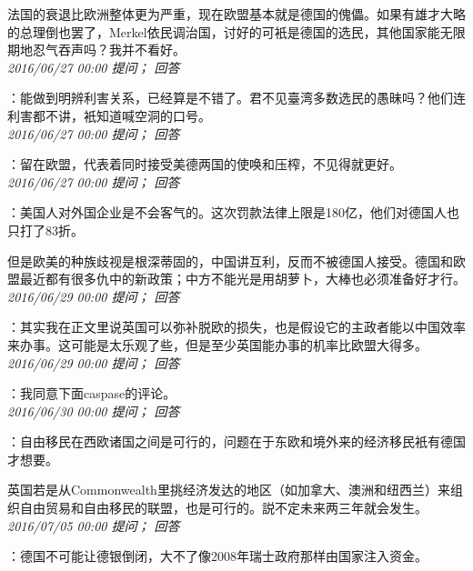 \documentclass[twocolumn]{ctexart}
\begin{document}
法国的衰退比欧洲整体更为严重，现在欧盟基本就是德国的傀儡。如果有雄才大略的总理倒也罢了，Merkel依民调治国，讨好的可衹是德国的选民，其他国家能无限期地忍气吞声吗？我并不看好。\\

\textit{\hfill\noindent\small 2016/06/27 00:00 提问； 回答}

：能做到明辨利害关系，已经算是不错了。君不见臺湾多数选民的愚昧吗？他们连利害都不讲，衹知道喊空洞的口号。\\

\textit{\hfill\noindent\small 2016/06/27 00:00 提问； 回答}

：留在欧盟，代表着同时接受美德两国的使唤和压榨，不见得就更好。\\

\textit{\hfill\noindent\small 2016/06/27 00:00 提问； 回答}

：美国人对外国企业是不会客气的。这次罚款法律上限是180亿，他们对德国人也只打了83折。

但是欧美的种族歧视是根深蒂固的，中国讲互利，反而不被德国人接受。德国和欧盟最近都有很多仇中的新政策；中方不能光是用胡萝卜，大棒也必须准备好才行。\\

\textit{\hfill\noindent\small 2016/06/29 00:00 提问； 回答}

：其实我在正文里说英国可以弥补脱欧的损失，也是假设它的主政者能以中国效率来办事。这可能是太乐观了些，但是至少英国能办事的机率比欧盟大得多。\\

\textit{\hfill\noindent\small 2016/06/29 00:00 提问； 回答}

：我同意下面caspase的评论。\\

\textit{\hfill\noindent\small 2016/06/30 00:00 提问； 回答}

：自由移民在西欧诸国之间是可行的，问题在于东欧和境外来的经济移民衹有德国才想要。

英国若是从Commonwealth里挑经济发达的地区（如加拿大、澳洲和纽西兰）来组织自由贸易和自由移民的联盟，也是可行的。説不定未来两三年就会发生。\\

\textit{\hfill\noindent\small 2016/07/05 00:00 提问； 回答}

：德国不可能让德银倒闭，大不了像2008年瑞士政府那样由国家注入资金。\\
\end{document}
